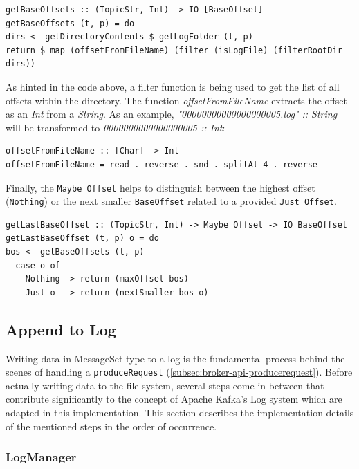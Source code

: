 \begin{lstlisting}[caption={Determining all base offsets for given topic and partition}]
getBaseOffsets :: (TopicStr, Int) -> IO [BaseOffset]
getBaseOffsets (t, p) = do
dirs <- getDirectoryContents $ getLogFolder (t, p)
return $ map (offsetFromFileName) (filter (isLogFile) (filterRootDir dirs))
\end{lstlisting}

As hinted in the code above, a filter function is being used to get the list of
all offsets within the directory. The function \textit{offsetFromFileName}
extracts the offset as an \textit{Int} from a \textit{String}. As an example,
\textit{"00000000000000000005.log" :: String } will be transformed to
\textit{0000000000000000005 :: Int}:

\begin{lstlisting}[caption={Get numeric value (offset) from given string (filename)}]
offsetFromFileName :: [Char] -> Int
offsetFromFileName = read . reverse . snd . splitAt 4 . reverse
\end{lstlisting}

Finally, the \lstinline{Maybe Offset} helps to distinguish between the highest offset
(\lstinline{Nothing}) or the next smaller \lstinline{BaseOffset} related to a provided
\lstinline{Just Offset}. 

\begin{lstlisting}[caption={Get highest base offset existing of given topic and partition}]
getLastBaseOffset :: (TopicStr, Int) -> Maybe Offset -> IO BaseOffset
getLastBaseOffset (t, p) o = do
bos <- getBaseOffsets (t, p)
  case o of
    Nothing -> return (maxOffset bos)
    Just o  -> return (nextSmaller bos o)
\end{lstlisting}

\subsection{Append to Log}
\label{subsec:broker-log-append}

Writing data in MessageSet type to a log is the fundamental process behind the
scenes of handling a \lstinline{produceRequest}
(\ref{subsec:broker-api-producerequest}). Before actually writing data
to the file system, several steps come in between that contribute
significantly to the concept of Apache Kafka's Log system which are adapted in
this implementation. This section describes the implementation details of the
mentioned steps in the order of occurrence.

\subsubsection{LogManager}

